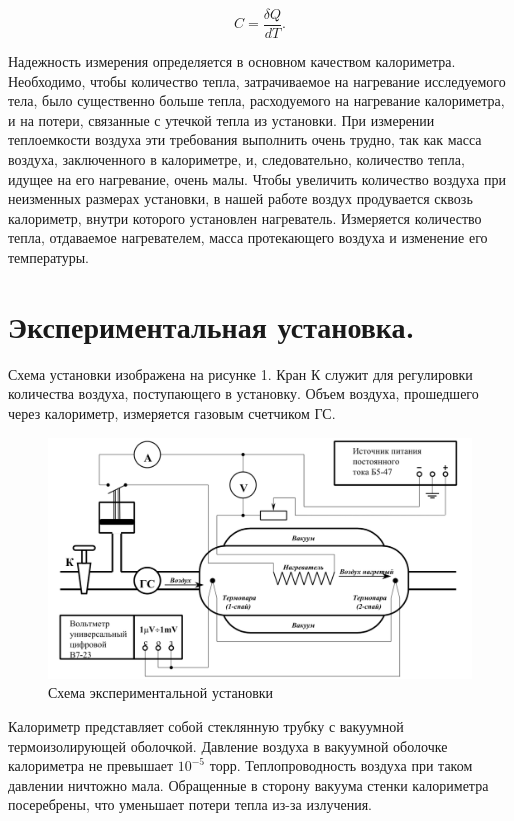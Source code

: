 \documentclass[a4paper,12pt]{article} %
\begin{document}
\begin{equation*}
	C = \frac{\delta Q}{dT}.
\end{equation*}


Надежность измерения определяется в основном качеством калориметра. Необходимо, чтобы количество тепла, затрачиваемое на нагревание исследуемого тела, было существенно больше тепла, расходуемого на нагревание калориметра, и на потери, связанные с утечкой тепла из установки. При измерении теплоемкости воздуха эти требования выполнить очень трудно, так как масса воздуха, заключенного в калориметре, и, следовательно, количество тепла, идущее на его нагревание, очень малы. Чтобы увеличить количество воздуха при неизменных размерах установки, в нашей работе воздух продувается сквозь калориметр, внутри которого установлен нагреватель. Измеряется количество тепла, отдаваемое нагревателем, масса протекающего воздуха и изменение его температуры.

\section*{Экспериментальная установка.}
Схема установки изображена на рисунке 1. Кран К служит для регулировки количества воздуха, поступающего в установку. Объем воздуха, прошедшего через калориметр, измеряется газовым счетчиком ГС.

\begin{figure}
	\centering
	\includegraphics[scale=0.5]{Рис1.png}
	\caption{Схема экспериментальной установки}
\end{figure}


Калориметр представляет собой стеклянную трубку с вакуумной термоизолирующей оболочкой. Давление воздуха в вакуумной оболочке калориметра не превышает $10^{-5}$ торр. Теплопроводность воздуха при таком давлении ничтожно мала. Обращенные в сторону вакуума стенки калориметра посеребрены, что уменьшает потери тепла из-за излучения.
\end{document}
